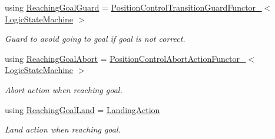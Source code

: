 \begin{DoxyCompactItemize}
using \hyperlink{classLogicStateMachineFrontEnd_a84fe5b03b104adc3c3406bb0b6ffa190}{Reaching\-Goal\-Guard} = \hyperlink{structPositionControlTransitionGuardFunctor__}{Position\-Control\-Transition\-Guard\-Functor\-\_\-}$<$ \hyperlink{basic__state__machine_8h_ab0b6ef21baf57684550a2f05c771bd86}{Logic\-State\-Machine} $>$
\begin{DoxyCompactList}\small\item\em Guard to avoid going to goal if goal is not correct. \end{DoxyCompactList}\item 
using \hyperlink{classLogicStateMachineFrontEnd_a6273a06430b7aa6088e25d9b78805f1a}{Reaching\-Goal\-Abort} = \hyperlink{structPositionControlAbortActionFunctor__}{Position\-Control\-Abort\-Action\-Functor\-\_\-}$<$ \hyperlink{basic__state__machine_8h_ab0b6ef21baf57684550a2f05c771bd86}{Logic\-State\-Machine} $>$
\begin{DoxyCompactList}\small\item\em Abort action when reaching goal. \end{DoxyCompactList}\item 
using \hyperlink{classLogicStateMachineFrontEnd_a3bec78d997dbc5ae5534c3b49c8127f5}{Reaching\-Goal\-Land} = \hyperlink{classLogicStateMachineFrontEnd_ad1619c7d43a216eb9238004470389f2e}{Landing\-Action}
\begin{DoxyCompactList}\small\item\em Land action when reaching goal. \end{DoxyCompactList}\end{DoxyCompactItemize}
